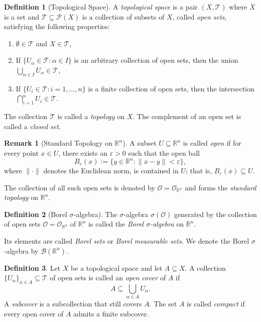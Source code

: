 \documentclass{article}
\theoremstyle{definition}
\newtheorem{definition}{Definition}[section]
\newtheorem{remark}{Remark}[section]
\begin{document}
\medskip
\begin{definition}[Topological Space]
A \textit{topological space} is a pair $(X, \mathcal{T})$ where $X$ is a set and $\mathcal{T} \subseteq \mathcal{P}(X)$ is a collection of subsets of $X$, called \textit{open sets}, satisfying the following properties:
\begin{enumerate}
    \item $\emptyset \in \mathcal{T}$ and $X \in \mathcal{T}$,
    \item If $\{U_\alpha \in \mathcal{T} : \alpha \in I\}$ is an arbitrary collection of open sets, then the union $\bigcup_{\alpha \in I} U_\alpha \in \mathcal{T}$,
    \item If $\{U_i \in \mathcal{T} : i = 1, \dots, n\}$ is a finite collection of open sets, then the intersection $\bigcap_{i=1}^n U_i \in \mathcal{T}$.
\end{enumerate}
The collection $\mathcal{T}$ is called a \textit{topology} on $X$. The complement of an open set is called a \textit{closed set}.
\end{definition}


\medskip
\begin{remark}[Standard Topology on \(\mathbb{R}^n\)]
A subset \( U \subseteq \mathbb{R}^n \) is called \textit{open} if for every point \( x \in U \), there exists an \(\varepsilon > 0\) such that the open ball
\[
B_\varepsilon(x) := \{ y \in \mathbb{R}^n : \|x - y\| < \varepsilon \},
\]
where \(\|\cdot\|\) denotes the Euclidean norm, is contained in \( U \); that is, \( B_\varepsilon(x) \subseteq U \).

The collection of all such open sets is denoted by \(\mathcal{O} = \mathcal{O}_{\mathbb{R}^n}\) and forms the \textit{standard topology} on \(\mathbb{R}^n\).
\end{remark}


\medskip
\begin{definition}[Borel $\sigma$-algebra]
The \(\sigma\)-algebra \(\sigma(\mathcal{O})\) generated by the collection of open sets \(\mathcal{O} = \mathcal{O}_{\mathbb{R}^n}\) of \(\mathbb{R}^n\) is called the \textit{Borel \(\sigma\)-algebra} on \(\mathbb{R}^n\). 

Its elements are called \textit{Borel sets} or \textit{Borel measurable sets}. We denote the Borel \(\sigma\)-algebra by \(\mathcal{B}(\mathbb{R}^n)\).
\end{definition}

\medskip
\begin{definition}
Let \( X \) be a topological space and let \( A \subseteq X \). A collection \( \{U_\alpha\}_{\alpha \in A} \subseteq \mathcal{T} \) of open sets is called an \emph{open cover} of \( A \) if
\[
A \subseteq \bigcup_{\alpha \in A} U_\alpha.
\]
A \emph{subcover} is a subcollection that still covers \( A \). The set \( A \) is called \emph{compact} if every open cover of \( A \) admits a finite subcover.
\end{definition}
\end{document}
